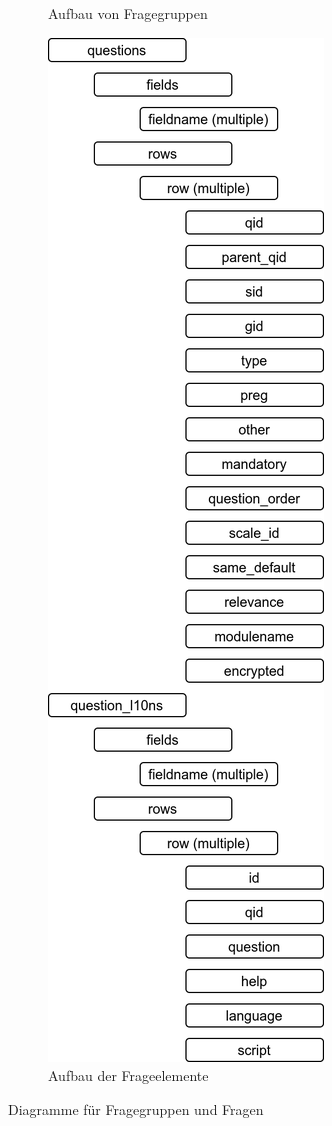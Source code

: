 \begin{figure}[h]
{\begin{subfigure}[b]{.45\textwidth}
			\caption{Aufbau von Fragegruppen}
		\end{subfigure}%
		\begin{subfigure}[b]{.45\textwidth}
			\includegraphics[width=.95\textwidth]{./img/append_lss_q.png}
			\caption{Aufbau der Frageelemente}
		\end{subfigure}%
		}
		\caption{Diagramme für Fragegruppen und Fragen}
\end{figure}

